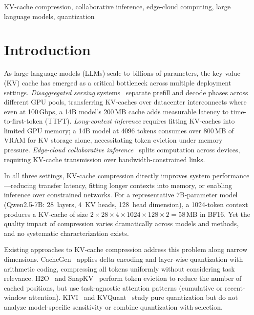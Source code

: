 \documentclass[conference]{IEEEtran}
\begin{document}
\begin{IEEEkeywords}
KV-cache compression, collaborative inference, edge-cloud computing, large language models, quantization
\end{IEEEkeywords}

\section{Introduction}
\label{sec:intro}

As large language models (LLMs) scale to billions of parameters, the key-value (KV) cache has emerged as a critical bottleneck across multiple deployment settings.
\emph{Disaggregated serving} systems~\cite{splitwise,distserve,mooncake} separate prefill and decode phases across different GPU pools, transferring KV-caches over datacenter interconnects where even at 100\,Gbps, a 14B model's 200\,MB cache adds measurable latency to time-to-first-token (TTFT).
\emph{Long-context inference} requires fitting KV-caches into limited GPU memory; a 14B model at 4096 tokens consumes over 800\,MB of VRAM for KV storage alone, necessitating token eviction under memory pressure.
\emph{Edge-cloud collaborative inference}~\cite{cachegen} splits computation across devices, requiring KV-cache transmission over bandwidth-constrained links.

In all three settings, KV-cache compression directly improves system performance---reducing transfer latency, fitting longer contexts into memory, or enabling inference over constrained networks.
For a representative 7B-parameter model (Qwen2.5-7B: 28~layers, 4~KV heads, 128~head dimension), a 1024-token context produces a KV-cache of size $2 \times 28 \times 4 \times 1024 \times 128 \times 2 = 58$\,MB in BF16.
Yet the quality impact of compression varies dramatically across models and methods, and no systematic characterization exists.

Existing approaches to KV-cache compression address this problem along narrow dimensions.
CacheGen~\cite{cachegen} applies delta encoding and layer-wise quantization with arithmetic coding, compressing all tokens uniformly without considering task relevance.
H2O~\cite{h2o} and SnapKV~\cite{snapkv} perform token eviction to reduce the number of cached positions, but use task-agnostic attention patterns (cumulative or recent-window attention).
KIVI~\cite{kivi} and KVQuant~\cite{kvquant} study pure quantization but do not analyze model-specific sensitivity or combine quantization with selection.
\end{document}
